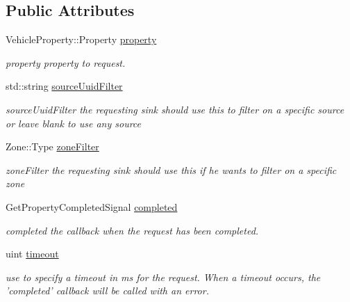 \subsection*{Public Attributes}
\begin{DoxyCompactItemize}
\item 
\hypertarget{classAsyncPropertyRequest_a221de270e3fb828ddbe821aa484a553f}{Vehicle\-Property\-::\-Property \hyperlink{classAsyncPropertyRequest_a221de270e3fb828ddbe821aa484a553f}{property}}\label{classAsyncPropertyRequest_a221de270e3fb828ddbe821aa484a553f}

\begin{DoxyCompactList}\small\item\em property property to request. \end{DoxyCompactList}\item 
\hypertarget{classAsyncPropertyRequest_a2250e8d29929dd879de141049ec78302}{std\-::string \hyperlink{classAsyncPropertyRequest_a2250e8d29929dd879de141049ec78302}{source\-Uuid\-Filter}}\label{classAsyncPropertyRequest_a2250e8d29929dd879de141049ec78302}

\begin{DoxyCompactList}\small\item\em source\-Uuid\-Filter the requesting sink should use this to filter on a specific source or leave blank to use any source \end{DoxyCompactList}\item 
\hypertarget{classAsyncPropertyRequest_a1a19d4677523d8934abe1ddfec5ba1b7}{Zone\-::\-Type \hyperlink{classAsyncPropertyRequest_a1a19d4677523d8934abe1ddfec5ba1b7}{zone\-Filter}}\label{classAsyncPropertyRequest_a1a19d4677523d8934abe1ddfec5ba1b7}

\begin{DoxyCompactList}\small\item\em zone\-Filter the requesting sink should use this if he wants to filter on a specific zone \end{DoxyCompactList}\item 
\hypertarget{classAsyncPropertyRequest_a12e1115b879ffc69a4d9bfd34df3e4be}{Get\-Property\-Completed\-Signal \hyperlink{classAsyncPropertyRequest_a12e1115b879ffc69a4d9bfd34df3e4be}{completed}}\label{classAsyncPropertyRequest_a12e1115b879ffc69a4d9bfd34df3e4be}

\begin{DoxyCompactList}\small\item\em completed the callback when the request has been completed. \end{DoxyCompactList}\item 
uint \hyperlink{classAsyncPropertyRequest_a449da60204ce7c13462be179f869105c}{timeout}
\begin{DoxyCompactList}\small\item\em use to specify a timeout in ms for the request. When a timeout occurs, the 'completed' callback will be called with an error. \end{DoxyCompactList}\end{DoxyCompactItemize}


